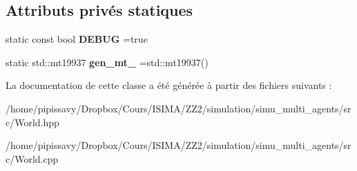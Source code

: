 \subsection*{Attributs privés statiques}
\begin{DoxyCompactItemize}
\item 
\hypertarget{classWorld_a18060cbfd04ea4f7b9d099bd52152e93}{static const bool {\bfseries D\-E\-B\-U\-G} =true}\label{classWorld_a18060cbfd04ea4f7b9d099bd52152e93}

\item 
\hypertarget{classWorld_ac4f18672fbf891451b559d6c4eb59310}{static std\-::mt19937 {\bfseries gen\-\_\-mt\-\_\-} =std\-::mt19937()}\label{classWorld_ac4f18672fbf891451b559d6c4eb59310}

\end{DoxyCompactItemize}


La documentation de cette classe a été générée à partir des fichiers suivants \-:\begin{DoxyCompactItemize}
\item 
/home/pipissavy/\-Dropbox/\-Cours/\-I\-S\-I\-M\-A/\-Z\-Z2/simulation/simu\-\_\-multi\-\_\-agents/src/World.\-hpp\item 
/home/pipissavy/\-Dropbox/\-Cours/\-I\-S\-I\-M\-A/\-Z\-Z2/simulation/simu\-\_\-multi\-\_\-agents/src/World.\-cpp\end{DoxyCompactItemize}
